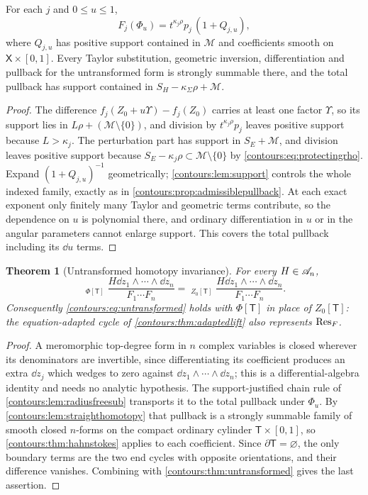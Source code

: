 \documentclass[11pt,letterpaper]{article}
\newtheorem{theorem}{Theorem}[section]
\theoremstyle{definition}
\theoremstyle{remark}
\newcommand{\HInt}{\mathop{\int^{\!H}}\nolimits}
\numberwithin{equation}{section}
\begin{document}
\begin{lemma}
\label{contours:lem:straighthomotopy}
For each $j$ and $0\le u\le1$,
\[
  F_j(\Phi_u)=t^{\kappa_j\rho}p_j\,(1+Q_{j,u}),
\]
where $Q_{j,u}$ has positive support contained in $\mathcal M$ and coefficients
smooth on $\mathsf X\times[0,1]$. Every Taylor substitution, geometric
inversion, differentiation and pullback for the untransformed form is strongly
summable there, and the total pullback has support contained in
$S_H-\kappa_\Sigma\rho+\mathcal M$.
\end{lemma}
\begin{proof}
The difference $f_j(Z_0+u\Upsilon)-f_j(Z_0)$ carries at least one factor
$\Upsilon$, so its support lies in $L\rho+(\mathcal M\setminus\{0\})$, and
division by $t^{\kappa_j\rho}p_j$ leaves positive support because
$L>\kappa_j$. The perturbation part has support in $S_E+\mathcal M$, and division
leaves positive support because $S_E-\kappa_j\rho\subset\mathcal M\setminus\{0\}$
by \eqref{contours:eq:protectingrho}. Expand $(1+Q_{j,u})^{-1}$ geometrically;
\cref{contours:lem:support} controls the whole indexed family, exactly as in
\cref{contours:prop:admissiblepullback}. At each exact exponent only finitely
many Taylor and geometric terms contribute, so the dependence on $u$ is
polynomial there, and ordinary differentiation in $u$ or in the angular
parameters cannot enlarge support. This covers the total pullback including its
$\dd u$ terms.
\end{proof}

\begin{theorem}[Untransformed homotopy invariance]
\label{contours:thm:untransformedhomotopy}
For every $H\in\mathscr A_n$,
\begin{equation}\label{contours:eq:untransformedhomotopy}
  \HInt_{\Phi[\mathsf T]}
  \frac{H\dd z_1\wedge\cdots\wedge \dd z_n}{F_1\cdots F_n}
  =\HInt_{Z_0[\mathsf T]}
  \frac{H\dd z_1\wedge\cdots\wedge \dd z_n}{F_1\cdots F_n} .
\end{equation}
Consequently \eqref{contours:eq:untransformed} holds with $\Phi[\mathsf T]$ in
place of $Z_0[\mathsf T]$: the equation-adapted cycle of
\cref{contours:thm:adaptedlift} also represents $\operatorname{Res}_F$.
\end{theorem}
\begin{proof}
A meromorphic top-degree form in $n$ complex variables is closed wherever its
denominators are invertible, since differentiating its coefficient produces an
extra $\dd z_j$ which wedges to zero against
$\dd z_1\wedge\cdots\wedge \dd z_n$; this is a differential-algebra identity and
needs no analytic hypothesis. The support-justified chain rule of
\cref{contours:lem:radiusfreesub} transports it to the total pullback under
$\Phi_u$. By \cref{contours:lem:straighthomotopy} that pullback is a
strongly summable family of smooth closed $n$-forms on the compact ordinary
cylinder $\mathsf T\times[0,1]$, so \cref{contours:thm:hahnstokes} applies to
each coefficient. Since $\partial\mathsf T=\varnothing$, the only boundary terms
are the two end cycles with opposite orientations, and their difference
vanishes. Combining with \cref{contours:thm:untransformed} gives the last
assertion.
\end{proof}
\end{document}
